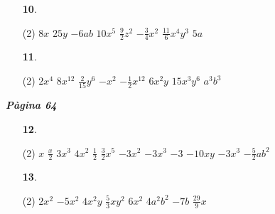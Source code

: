 \documentclass[a4paper, pdf, twoside]{book}
\begin{document}
\begin{multicols}{2}
\begin{enumerate}

 \item[\fontfamily{phv}\selectfont\color{blue}\textbf{10}. ] 
 \begin{tasks}[column-sep=1em, item-indent=1.3333em](2)
	 \task $8x$
	 \task $25y$
	 \task $-6ab$
	 \task $10x^5$
	 \task $\frac {9}{2}z^2$
	 \task $-\frac {3}{4}x^2$
	 \task $\frac {11}{6}x^4y^3$
	 \task $5a$
\end{tasks}
\vspace{0.25cm}



 \item[\fontfamily{phv}\selectfont\color{blue}\textbf{11}. ] 
 \begin{tasks}[column-sep=1em, item-indent=1.3333em](2)
	 \task $2x^4$
	 \task $8x^{12}$
	 \task $\frac {2}{15}y^6$
	 \task $-x^2$
	 \task $-\frac {1}{2}x^{12}$
	 \task $6x^2 y$
	 \task $15x^3 y^6$
	 \task $a^3 b^3$
\end{tasks}
 \end{enumerate}
\vspace{0.3cm}


{\textbf{\em Pàgina 64}} \hrulefill
\begin{enumerate}
\vspace{0.25cm}



 \item[\fontfamily{phv}\selectfont\color{blue}\textbf{12}. ] 
 \begin{tasks}[column-sep=1em, item-indent=1.3333em](2)
	 \task $x$
	 \task $\frac {x}{2}$
	 \task $3x^3$
	 \task $4x^2$
	 \task $\frac {1}{2}$
	 \task $\frac {3}{2}x^5$
	 \task $-3x^2$
	 \task $-3x^3$
	 \task $-3$
	 \task $-10xy$
	 \task $-3x^3$
	 \task $-\frac {5}{2}a b^2$
\end{tasks}
 \end{enumerate}
\begin{enumerate}
\vspace{0.25cm}



 \item[\fontfamily{phv}\selectfont\color{blue}\textbf{13}. ] 
 \begin{tasks}[column-sep=1em, item-indent=1.3333em](2)
	 \task $2x^2$
	 \task $-5x^2$
	 \task $4x^2 y$
	 \task $\frac {5}{3} x y^2$
	 \task $6x ^2$
	 \task $4 a^2 b^2$
	 \task $-7b$
	 \task $\frac {29}{9}x$
\end{tasks}
 \end{enumerate}
\vspace{0.3cm}


\end{multicols}
\end{document}
